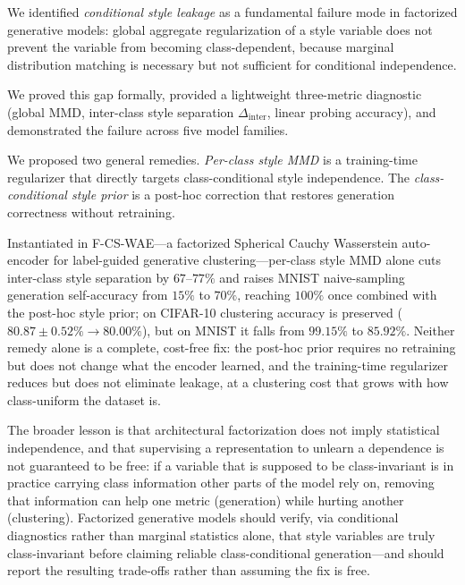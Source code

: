 \documentclass[10pt]{article}
\begin{document}
We identified \emph{conditional style leakage} as a fundamental failure mode in
factorized generative models: global aggregate regularization of a style variable
does not prevent the variable from becoming class-dependent, because marginal
distribution matching is necessary but not sufficient for conditional independence.

We proved this gap formally, provided a lightweight three-metric diagnostic
(global MMD, inter-class style separation $\Delta_{\mathrm{inter}}$, linear probing
accuracy), and demonstrated the failure across five model families.

We proposed two general remedies.
\emph{Per-class style MMD} is a training-time regularizer that directly targets
class-conditional style independence.
The \emph{class-conditional style prior} is a post-hoc correction that restores
generation correctness without retraining.

Instantiated in F-CS-WAE---a factorized Spherical Cauchy Wasserstein auto-encoder
for label-guided generative clustering---per-class style MMD alone cuts inter-class
style separation by $67$--$77\%$ and raises MNIST naive-sampling generation
self-accuracy from $15\%$ to $70\%$, reaching $100\%$ once combined with the
post-hoc style prior; on CIFAR-10 clustering accuracy is preserved
($80.87\pm0.52\%\to80.00\%$), but on MNIST it falls from $99.15\%$ to $85.92\%$.
Neither remedy alone is a complete, cost-free fix: the post-hoc prior requires no
retraining but does not change what the encoder learned, and the training-time
regularizer reduces but does not eliminate leakage, at a clustering cost that grows
with how class-uniform the dataset is.

The broader lesson is that architectural factorization does not imply statistical
independence, and that supervising a representation to unlearn a dependence is not
guaranteed to be free: if a variable that is supposed to be class-invariant is in
practice carrying class information other parts of the model rely on, removing that
information can help one metric (generation) while hurting another (clustering).
Factorized generative models should verify, via conditional diagnostics rather than
marginal statistics alone, that style variables are truly class-invariant before
claiming reliable class-conditional generation---and should report the resulting
trade-offs rather than assuming the fix is free.



\end{document}
